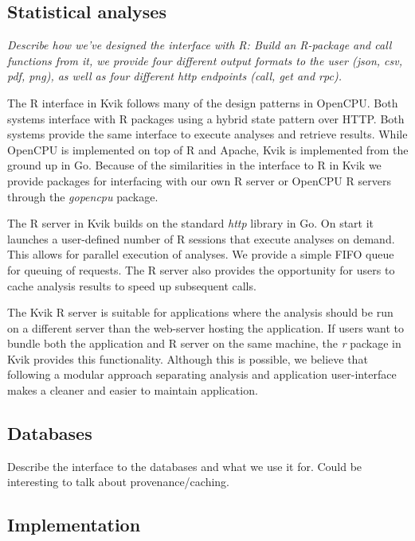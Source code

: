 \subsection*{Statistical analyses}
\emph{Describe how we've designed the interface with R: Build an R-package and call
functions from it, we provide four different output formats to the user
(json, csv, pdf, png),  as well as four different http endpoints (call, get and
rpc).}

The R interface in Kvik follows many of the design patterns in OpenCPU. Both
systems interface with R packages using a hybrid state pattern over HTTP. Both
systems provide the same interface to execute analyses and retrieve results.
While OpenCPU is implemented on top of R and Apache, Kvik is implemented from
the ground up in Go. Because of the similarities in the interface to R in Kvik
we provide packages for interfacing with our own R server or OpenCPU R servers
through the \emph{gopencpu} package. 

The R server in Kvik builds on the standard \emph{http} library in Go. On start
it launches a user-defined number of R sessions that execute analyses on demand.
This allows for parallel execution of analyses. We provide a simple FIFO queue
for queuing of requests. The R server also provides the opportunity for users to
cache analysis results to speed up subsequent calls. 

The Kvik R server is suitable for applications where the analysis should be run
on a different server than the web-server hosting the application. If users want
to bundle both the application and R server on the same machine, the \emph{r}
package in Kvik provides this functionality. Although this is possible, we
believe that following a modular approach separating analysis and
application user-interface makes a cleaner and easier to maintain application. 

\subsection*{Databases}
Describe the interface to the databases and what we use it for. Could be
interesting to talk about provenance/caching.

\subsection*{Implementation}


